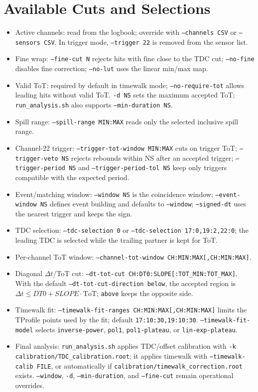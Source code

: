 \documentclass[10pt]{article}
\begin{document}
\section*{Available Cuts and Selections}
\begin{itemize}
  \item Active channels: read from the logbook; override with \texttt{--channels CSV} or \texttt{--sensors CSV}. In trigger mode, \texttt{--trigger 22} is removed from the sensor list.
  \item Fine wrap: \texttt{--fine-cut N} rejects hits with \(\mathrm{fine}\) close to the TDC cut; \texttt{--no-fine} disables fine correction; \texttt{--no-lut} uses the linear min/max map.
  \item Valid ToT: required by default in timewalk mode; \texttt{--no-require-tot} allows leading hits without valid ToT. \texttt{-d NS} sets the maximum accepted ToT; \texttt{run\_analysis.sh} also supports \texttt{--min-duration NS}.
  \item Spill range: \texttt{--spill-range MIN:MAX} reads only the selected inclusive spill range.
  \item Channel-22 trigger: \texttt{--trigger-tot-window MIN:MAX} cuts on trigger ToT; \texttt{--trigger-veto NS} rejects rebounds within NS after an accepted trigger; \texttt{--trigger-period NS} and \texttt{--trigger-period-tol NS} keep only triggers compatible with the expected period.
  \item Event/matching window: \texttt{--window NS} is the coincidence window; \texttt{--event-window NS} defines event building and defaults to \texttt{--window}; \texttt{--signed-dt} uses the nearest trigger and keeps the sign.
  \item TDC selection: \texttt{--tdc-selection 0} or \texttt{--tdc-selection 17:0,19:2,22:0}; the leading TDC is selected while the trailing partner is kept for ToT.
  \item Per-channel ToT window: \texttt{--channel-tot-window CH:MIN:MAX[,CH:MIN:MAX]}.
  \item Diagonal \(\Delta t\)/ToT cut: \texttt{--dt-tot-cut CH:DT0:SLOPE[:TOT\_MIN:TOT\_MAX]}. With the default \texttt{--dt-tot-cut-direction below}, the accepted region is \(\Delta t \le DT0 + SLOPE\cdot\mathrm{ToT}\); \texttt{above} keeps the opposite side.
  \item Timewalk fit: \texttt{--timewalk-fit-ranges CH:MIN:MAX[,CH:MIN:MAX]} limits the TProfile points used by the fit; default \texttt{17:10:30,19:10:30}. \texttt{--timewalk-fit-model} selects \texttt{inverse-power}, \texttt{pol1}, \texttt{pol1-plateau}, or \texttt{lin-exp-plateau}.
  \item Final analysis: \texttt{run\_analysis.sh} applies TDC/offset calibration with \texttt{-k calibration/TDC\_calibration.root}; it applies timewalk with \texttt{--timewalk-calib FILE}, or automatically if \texttt{calibration/timewalk\_correction.root} exists. \texttt{--window}, \texttt{-d}, \texttt{--min-duration}, and \texttt{--fine-cut} remain operational overrides.
\end{itemize}
\end{document}
